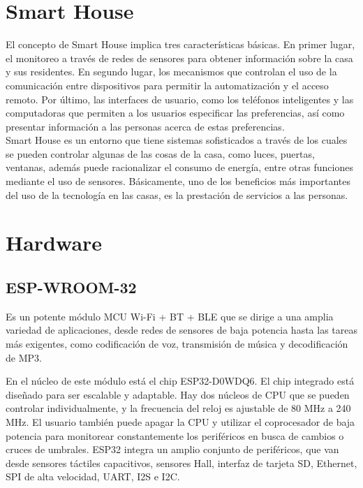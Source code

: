 \section{Smart House}

El concepto de Smart House implica tres características básicas. En primer lugar, el monitoreo a través de redes de sensores para obtener información sobre la casa y sus residentes. En segundo lugar, los mecanismos que controlan el uso de la comunicación entre dispositivos para permitir la automatización y el acceso remoto. Por último, las interfaces de usuario, como los teléfonos inteligentes y las computadoras que permiten a los usuarios especificar las preferencias, así como presentar información a las personas acerca de estas preferencias. \\

Smart House es un entorno que tiene sistemas sofisticados a través de los cuales se pueden controlar algunas de las cosas de la casa, como luces, puertas, ventanas, además  puede racionalizar el consumo de energía, entre otras funciones mediante el uso de sensores. Básicamente, uno de los beneficios más importantes del uso de la tecnología en las casas, es la prestación de servicios a las personas.\cite{Howedi2016} \\

\section{Hardware}

\subsection{ESP-WROOM-32}

\cite{EW32} Es un potente módulo MCU Wi-Fi + BT + BLE que se dirige a una amplia variedad de aplicaciones, desde redes de sensores de baja potencia hasta las tareas más exigentes, como codificación de voz, transmisión de música y decodificación de MP3.

En el núcleo de este módulo está el chip ESP32-D0WDQ6. El chip integrado está diseñado para ser escalable y adaptable. Hay dos núcleos de CPU que se pueden controlar individualmente, y la frecuencia del reloj es ajustable de 80 MHz a 240 MHz. El usuario también puede apagar la CPU y utilizar el coprocesador de baja potencia para monitorear constantemente los periféricos en busca de cambios o cruces de umbrales. ESP32 integra un amplio conjunto de periféricos, que van desde sensores táctiles capacitivos, sensores Hall, interfaz de tarjeta SD, Ethernet, SPI de alta velocidad, UART, I2S e I2C.

